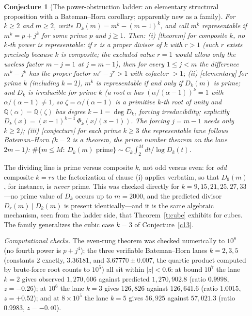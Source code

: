 \documentclass[11pt]{article}
\newtheorem{conjecture}{Conjecture}
\theoremstyle{definition}
\begin{document}
\setcounter{conjecture}{22}%
\begin{conjecture}[The power-obstruction ladder: an elementary
structural proposition with a Bateman--Horn corollary; apparently new
as a family]\label{c4}
For $k\ge2$ and $m\ge2$, write $D_k(m)=m^k-(m-1)^k$, and call $m^k$
representable if $m^k=p+j^k$ for some prime $p$ and $j\ge1$.  Then:
\emph{(i)} [theorem] for \emph{composite} $k$, no $k$-th power is
representable: if $r$ is a proper divisor of $k$ with $r>1$ (such
$r$ exists precisely because $k$ is composite; the excluded value
$r=1$ would allow only the useless factor $m-j=1$ at $j=m-1$), then
for every
$1\le j<m$ the difference $m^k-j^k$ has the proper factor $m^r-j^r>1$
with cofactor $>1$;
\emph{(ii)} [elementary] for \emph{prime} $k$ (including $k=2$),
$m^k$ is representable if and only if $D_k(m)$ is prime; and $D_k$ is
irreducible for prime $k$ (a root $\alpha$ has $(\alpha/(\alpha-1))^k=1$ with
$\alpha/(\alpha-1)\neq1$, so $\zeta=\alpha/(\alpha-1)$ is a primitive
$k$-th root of unity and $\mathbb Q(\alpha)=\mathbb Q(\zeta)$ has degree
$k-1=\deg D_k$, forcing irreducibility; explicitly
$D_k(x)=(x-1)^{k-1}\,\Phi_k(x/(x-1))$.  The forcing $j=m-1$ needs only
$k\ge2$);
\emph{(iii)} [conjecture] for each prime $k\ge3$ the representable lane follows
Bateman--Horn ($k=2$ is a theorem, the prime number theorem on the
lane $2m-1$):
$\#\{m\le M:\ D_k(m) \text{ prime}\}\sim C_k\int_2^M dt/\log D_k(t)$.
\end{conjecture}

The dividing line is prime versus composite $k$, not odd versus even:
for \emph{odd} composite $k=rs$ the factorization of clause (i) applies
verbatim, so that $D_9(m)$, for instance, is \emph{never} prime.  This
was checked directly for $k=9,15,21,25,27,33$---no prime value of $D_k$
occurs up to $m=2000$, and the predicted divisor $D_r(m)\mid D_k(m)$ is
present identically---and it is the same algebraic mechanism, seen from
the ladder side, that Theorem~\ref{t:cube} exhibits for cubes.  The
family generalizes the cubic case $k=3$ of Conjecture~\ref{c13}.

\emph{Computational checks.}  The even-rung theorem was checked numerically to
$10^8$ (no fourth power is $p+j^4$); the three verifiable
Bateman--Horn lanes $k=2,3,5$ (constants $2$ exactly, $3.36181$, and
$3.67770\pm0.007$, the quartic product computed by brute-force root
counts to $10^5$) all sit within $|z|<0.6$: at bound $10^{7}$ the lane
$k=2$ gives observed $1{,}270{,}606$ against predicted
$1{,}270{,}902.8$ (ratio $0.9998$, $z=-0.26$); at $10^{6}$ the lane
$k=3$ gives $126{,}826$ against $126{,}641.6$ (ratio $1.0015$,
$z=+0.52$); and at $8\times10^{5}$ the lane $k=5$ gives $56{,}925$
against $57{,}021.3$ (ratio $0.9983$, $z=-0.40$).
\end{document}
